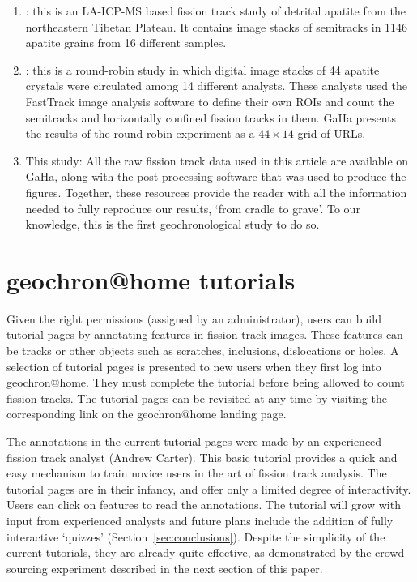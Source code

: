 \documentclass[gchron, manuscript]{copernicus}
\begin{document}
\begin{enumerate}
\item{\citet{guo2025}}: this is an LA-ICP-MS based fission track study
  of detrital apatite from the northeastern Tibetan Plateau. It
  contains image stacks of semitracks in 1146 apatite grains from 16
  different samples.
\item{\citet{tamer2025}}: this is a round-robin study in which digital
  image stacks of 44 apatite crystals were circulated among 14
  different analysts. These analysts used the FastTrack image analysis
  software \citep[which is part of the Fission Track Studio
    suite;][]{gleadow2009} to define their own ROIs and count the
  semitracks and horizontally confined fission tracks in them. GaHa
  presents the results of the round-robin experiment as a
  ${44}\times{14}$ grid of URLs.
\item{This study}: All the raw fission track data used in this article
  are available on GaHa, along with the post-processing software that
  was used to produce the figures. Together, these resources provide
  the reader with all the information needed to fully reproduce our
  results, `from cradle to grave'. To our knowledge, this is the first
  geochronological study to do so.
\end{enumerate}

\section{geochron@home tutorials}\label{sec:tutorial}

Given the right permissions (assigned by an administrator), users can
build tutorial pages by annotating features in fission track images.
These features can be tracks or other objects such as scratches,
inclusions, dislocations or holes. A selection of tutorial pages is
presented to new users when they first log into
geochron@home. They must complete the tutorial before being
allowed to count fission tracks.  The tutorial pages can be revisited
at any time by visiting the corresponding link on the
geochron@home landing page.\medskip

The annotations in the current tutorial pages were made by an
experienced fission track analyst (Andrew Carter). This basic tutorial
provides a quick and easy mechanism to train novice users in the art
of fission track analysis. The tutorial pages are in their infancy,
and offer only a limited degree of interactivity. Users can click on
features to read the annotations. The tutorial will grow with input
from experienced analysts and future plans include the addition of
fully interactive `quizzes' (Section~\ref{sec:conclusions}). Despite
the simplicity of the current tutorials, they are already quite
effective, as demonstrated by the crowd-sourcing experiment described
in the next section of this paper.
\end{document}
